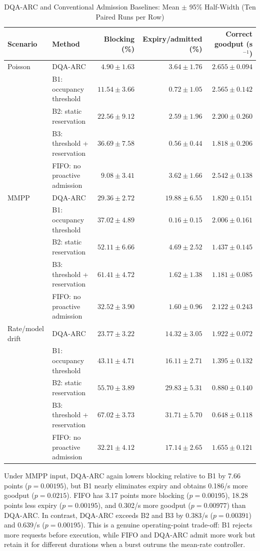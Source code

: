 \documentclass[journal]{IEEEtran}
\newcommand{\method}{DQA-ARC}
\begin{document}
\begin{table}[t]
\centering
\caption{\method{} and Conventional Admission Baselines: Mean $\pm$ 95\% Half-Width (Ten Paired Runs per Row)}
\label{tab:standard-baselines}
\small
\begin{tabular}{@{}llrrr@{}}
\toprule
Scenario & Method & Blocking (\%) & Expiry/admitted (\%) & Correct goodput (s$^{-1}$) \\
\midrule
Poisson & \method{} & $4.90\pm1.63$ & $3.64\pm1.76$ & $2.655\pm0.094$ \\
 & B1: occupancy threshold & $11.54\pm3.66$ & $0.72\pm1.05$ & $2.565\pm0.142$ \\
 & B2: static reservation & $22.56\pm9.12$ & $2.59\pm1.96$ & $2.200\pm0.260$ \\
 & B3: threshold + reservation & $36.69\pm7.58$ & $0.56\pm0.44$ & $1.818\pm0.206$ \\
 & FIFO: no proactive admission & $9.08\pm3.41$ & $3.62\pm1.66$ & $2.542\pm0.138$ \\
\midrule
MMPP & \method{} & $29.36\pm2.72$ & $19.88\pm6.55$ & $1.820\pm0.151$ \\
 & B1: occupancy threshold & $37.02\pm4.89$ & $0.16\pm0.15$ & $2.006\pm0.161$ \\
 & B2: static reservation & $52.11\pm6.66$ & $4.69\pm2.52$ & $1.437\pm0.145$ \\
 & B3: threshold + reservation & $61.41\pm4.72$ & $1.62\pm1.38$ & $1.181\pm0.085$ \\
 & FIFO: no proactive admission & $32.52\pm3.90$ & $1.60\pm0.96$ & $2.122\pm0.243$ \\
\midrule
Rate/model drift & \method{} & $23.77\pm3.22$ & $14.32\pm3.05$ & $1.922\pm0.072$ \\
 & B1: occupancy threshold & $43.11\pm4.71$ & $16.11\pm2.71$ & $1.395\pm0.132$ \\
 & B2: static reservation & $55.70\pm3.89$ & $29.83\pm5.31$ & $0.880\pm0.140$ \\
 & B3: threshold + reservation & $67.02\pm3.73$ & $31.71\pm5.70$ & $0.648\pm0.118$ \\
 & FIFO: no proactive admission & $32.21\pm4.12$ & $17.14\pm2.65$ & $1.655\pm0.121$ \\
\bottomrule
\end{tabular}
\end{table}

Under MMPP input, \method{} again lowers blocking relative to B1 by 7.66 points ($p=0.00195$), but B1 nearly eliminates expiry and obtains 0.186/s more goodput ($p=0.0215$). FIFO has 3.17 points more blocking ($p=0.00195$), 18.28 points less expiry ($p=0.00195$), and 0.302/s more goodput ($p=0.00977$) than \method{}. In contrast, \method{} exceeds B2 and B3 by 0.383/s ($p=0.00391$) and 0.639/s ($p=0.00195$). This is a genuine operating-point trade-off: B1 rejects more requests before execution, while FIFO and \method{} admit more work but retain it for different durations when a burst outruns the mean-rate controller.
\end{document}
